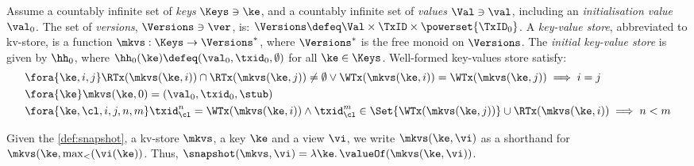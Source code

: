 \begin{definition}
\label{def:mkvs-appendix}
Assume a countably infinite set of \emph{keys} $\Keys \ni \ke$, 
and a countably infinite set of  \emph{values} $\Val \ni \val$, 
including an \emph{initialisation value} $\val_0 $.
The set of \emph{versions}, $\Versions \ni \ver$, is: $\Versions \defeq \Val \times \TxID \times \powerset{\TxID_{0}}$. 
A \emph{key-value store}, abbreviated to kv-store,  is a function $\mkvs: \Keys \rightarrow \Versions^{\ast}$, 
where $\Versions^{\ast}$ is the free monoid on $\Versions$. 
The \emph{initial key-value store} is given by $\hh_0$, where 
$\hh_{0}(\ke)\defeq  (\val_0, \txid_0, \emptyset)$ for
all $\ke \in \Keys$.
Well-formed key-values store satisfy:
\begin{align}
& \fora{\ke, i, j} 
\RTx(\mkvs(\ke, i)) \cap \RTx(\mkvs(\ke, j)) \neq \emptyset \lor
\WTx(\mkvs(\ke, i)) = \WTx(\mkvs(\ke, j))
\implies i = j  \\
& \fora{\ke} \mkvs(\ke, 0) = (\val_0, \txid_0, \stub) \\
& \fora{ \ke, \cl, i,j, n, m} 
\txid_{\cl}^{n} = \WTx(\mkvs(\ke,i)) \wedge \txid_{\cl}^{m} \in
\Set{\WTx(\mkvs(\ke,j))} \cup \RTx(\mkvs(\ke, i)) \implies n < m
\end{align}
\end{definition}

Given the \cref{def:snapshot}, 
a kv-store $\mkvs$, a key $\ke$ and a view $\vi$, 
we write $\mkvs(\ke, \vi)$ as a shorthand for 
$\mkvs(\ke, \max_{<}(\vi(\ke))$. Thus, $\snapshot(\mkvs, \vi) = \lambda \ke \ldotp \valueOf(\mkvs(\ke, \vi))$. 
